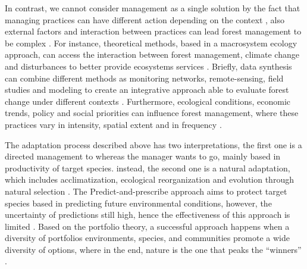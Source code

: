 In contrast, we cannot consider management as a single solution by the fact that managing practices can have different action depending on the context \parencite{Millar2007}, also external factors and interaction between practices can lead forest management to be complex \parencite{Becknell2015}.
For instance, theoretical methods, based in a macrosystem ecology approach, can access the interaction between forest management, climate change and disturbances to better provide ecosystems services \parencite{Heffernan2014,Becknell2015}.
Briefly, data synthesis can combine different methods as monitoring networks, remote-sensing, field studies and modeling to create an integrative approach able to evaluate forest change under different contexts \parencite{Becknell2015}.
Furthermore, ecological conditions, economic trends, policy and social priorities can influence forest management, where these practices vary in intensity, spatial extent and in frequency \parencite{Becknell2015}.

The adaptation process described above has two interpretations, the first one is a directed management to whereas the manager wants to go, mainly based in productivity of target species.  instead, the second one is a natural adaptation, which includes acclimatization, ecological reorganization and evolution through natural selection \parencite{Webster2017}.
The Predict-and-prescribe approach aims to protect target species based in predicting future environmental conditions, however, the uncertainty of predictions still high, hence the effectiveness of this approach is limited \parencite{Schindler2015}.
Based on the portfolio theory, a successful approach happens when a diversity of portfolios environments, species, and communities promote a wide diversity of options, where in the end, nature is the one that peaks the ``winners'' \parencite{Webster2017}.

%



